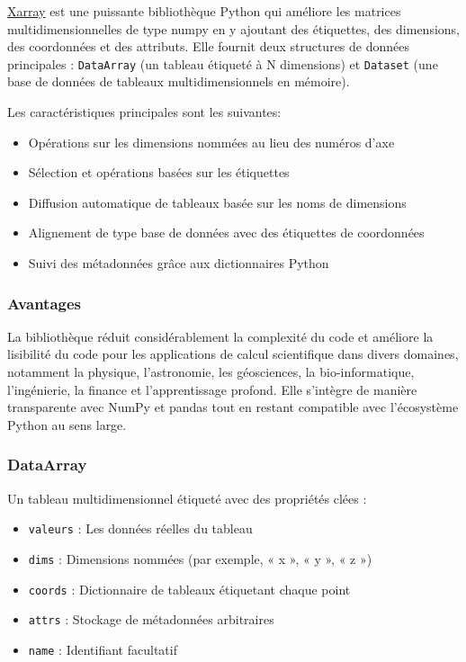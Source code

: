 \documentclass[
  11pt,
  letterpaper,
  open=any,
  twoside=false,
  french]{scrbook}
\begin{document}
\href{https://docs.xarray.dev/en/latest/getting-started-guide/why-xarray.html}{Xarray}
est une puissante bibliothèque Python qui améliore les matrices
multidimensionnelles de type numpy en y ajoutant des étiquettes, des
dimensions, des coordonnées et des attributs. Elle fournit deux
structures de données principales : \texttt{DataArray} (un tableau
étiqueté à N dimensions) et \texttt{Dataset} (une base de données de
tableaux multidimensionnels en mémoire).

Les caractéristiques principales sont les suivantes:

\begin{itemize}
\item
  Opérations sur les dimensions nommées au lieu des numéros d'axe
\item
  Sélection et opérations basées sur les étiquettes
\item
  Diffusion automatique de tableaux basée sur les noms de dimensions
\item
  Alignement de type base de données avec des étiquettes de coordonnées
\item
  Suivi des métadonnées grâce aux dictionnaires Python
\end{itemize}

\subsubsection{Avantages}\label{avantages}

La bibliothèque réduit considérablement la complexité du code et
améliore la lisibilité du code pour les applications de calcul
scientifique dans divers domaines, notamment la physique, l'astronomie,
les géosciences, la bio-informatique, l'ingénierie, la finance et
l'apprentissage profond. Elle s'intègre de manière transparente avec
NumPy et pandas tout en restant compatible avec l'écosystème Python au
sens large.

\subsubsection{DataArray}\label{dataarray}

Un tableau multidimensionnel étiqueté avec des propriétés clées :

\begin{itemize}
\item
  \texttt{valeurs} : Les données réelles du tableau
\item
  \texttt{dims} : Dimensions nommées (par exemple, « x », « y », « z »)
\item
  \texttt{coords} : Dictionnaire de tableaux étiquetant chaque point
\item
  \texttt{attrs} : Stockage de métadonnées arbitraires
\item
  \texttt{name} : Identifiant facultatif
\end{itemize}
\end{document}
